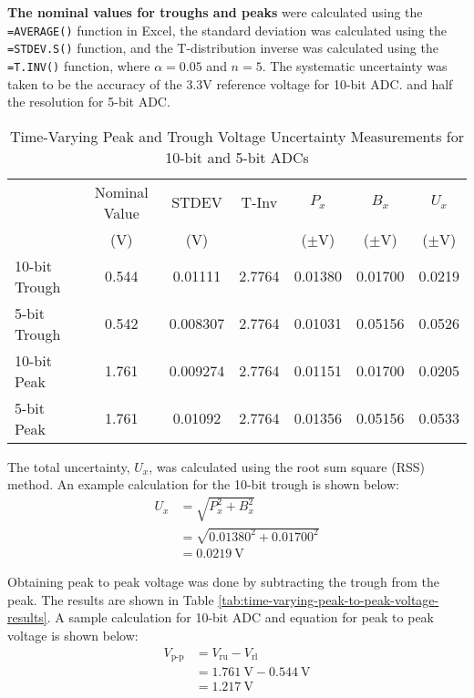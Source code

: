 \noindent \textbf{The nominal values for troughs and peaks} were calculated using the \texttt{=AVERAGE()} function in Excel, the standard deviation 
was calculated using the \texttt{=STDEV.S()} function, and the T-distribution inverse was calculated using the \texttt{=T.INV()} function, where $\alpha = 0.05$ 
and $n = 5$. The systematic uncertainty was taken to be the accuracy of the 3.3V reference voltage for 10-bit ADC. and half the resolution for 5-bit ADC.

\begin{table}[h]
   \centering
   \caption{Time-Varying Peak and Trough Voltage Uncertainty Measurements for 10-bit and 5-bit ADCs}
   \label{tab:time-varying-peak-to-peak-voltage-uncertainty-measurements}
   \begin{tabular}{lcccccc}
      \toprule
      & Nominal Value & STDEV & T-Inv & $P_x$ & $B_x$ & $U_x$ \\
      & (V)           & (V)                &       & ($\pm$V)   & ($\pm$V)   & ($\pm$V)   \\
      \midrule
      10-bit Trough & 0.544 & 0.01111 & 2.7764 & 0.01380 & 0.01700 & 0.0219 \\
      5-bit Trough  & 0.542 & 0.008307 & 2.7764 & 0.01031 & 0.05156 & 0.0526 \\
      10-bit Peak   & 1.761 & 0.009274 & 2.7764 & 0.01151 & 0.01700 & 0.0205 \\
      5-bit Peak    & 1.761 & 0.01092 & 2.7764 & 0.01356 & 0.05156 & 0.0533 \\
      \bottomrule
   \end{tabular}
\end{table}
\FloatBarrier
\noindent The total uncertainty, $U_x$, was calculated using the root sum square (RSS) method. An example calculation for the 10-bit trough is shown below:
\[
   \begin{aligned}
      U_x &= \sqrt{P_x^2 + B_x^2} \\
            &= \sqrt{0.01380^2 + 0.01700^2} \\
            &= \boxed{\qty{0.0219}{\volt}}
   \end{aligned}
\]

\noindent Obtaining peak to peak voltage was done by subtracting the trough from the peak. The results are shown in Table \ref{tab:time-varying-peak-to-peak-voltage-results}. 
A sample calculation for 10-bit ADC and equation for peak to peak voltage is shown below:
\[
\begin{aligned}
   V_{\text{p-p}} &= V_{\text{ru}} - V_{\text{rl}} \\
                  &= \qty{1.761}{\volt} - \qty{0.544}{\volt} \\
                  &= \boxed{\qty{1.217}{\volt}}
\end{aligned}
\]

